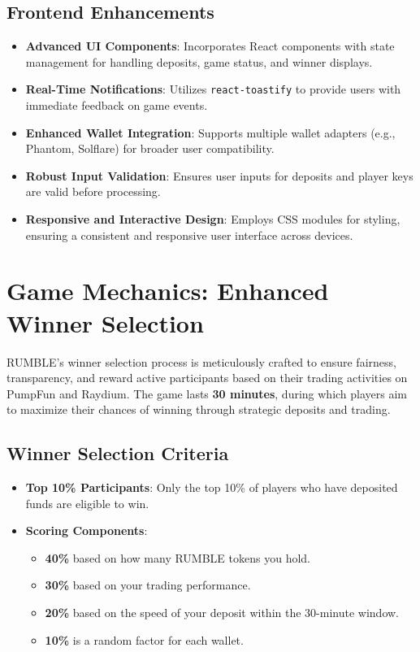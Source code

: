 \documentclass[11pt,a4paper]{article}
\begin{document}
\subsection{Frontend Enhancements}

\begin{itemize}
    \item \textbf{Advanced UI Components}: Incorporates React components with state management for handling deposits, game status, and winner displays.
    \item \textbf{Real-Time Notifications}: Utilizes \texttt{react-toastify} to provide users with immediate feedback on game events.
    \item \textbf{Enhanced Wallet Integration}: Supports multiple wallet adapters (e.g., Phantom, Solflare) for broader user compatibility.
    \item \textbf{Robust Input Validation}: Ensures user inputs for deposits and player keys are valid before processing.
    \item \textbf{Responsive and Interactive Design}: Employs CSS modules for styling, ensuring a consistent and responsive user interface across devices.
\end{itemize}

\section{Game Mechanics: Enhanced Winner Selection}

RUMBLE's winner selection process is meticulously crafted to ensure fairness, transparency, and reward active participants based on their trading activities on PumpFun and Raydium. The game lasts \textbf{30 minutes}, during which players aim to maximize their chances of winning through strategic deposits and trading.

\subsection{Winner Selection Criteria}

\begin{itemize}
    \item \textbf{Top 10\% Participants}: Only the top 10\% of players who have deposited funds are eligible to win.
    \item \textbf{Scoring Components}:
    \begin{itemize}
        \item \textbf{40\%} based on how many RUMBLE tokens you hold.
        \item \textbf{30\%} based on your trading performance.
        \item \textbf{20\%} based on the speed of your deposit within the 30-minute window.
        \item \textbf{10\%} is a random factor for each wallet.
    \end{itemize}
\end{itemize}
\end{document}
